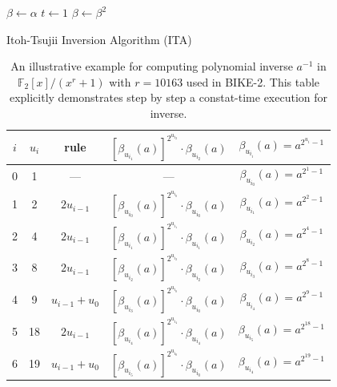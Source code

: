 \documentclass[preprint]{iacrtrans}
\begin{document}
\begin{algorithm}[!tb]
\DontPrintSemicolon %
$\beta \gets \alpha$ \;
$t \gets 1$ \;
 $\beta \gets \beta ^2$ \;
\Return {$\beta$}


\caption{Itoh-Tsujii Inversion Algorithm (ITA) \cite{hu2015fast}}
\label{algo:ITA}
\end{algorithm}

\begin{table}[!tb]\centering
\caption{An illustrative example for computing polynomial inverse $a^{-1}$ in $\mathbb{F}_2[x]/(x^r+1)$ with $r=10163$ used in BIKE-2. This table explicitly demonstrates step by step a constat-time execution for inverse.}\scriptsize
\label{table:ita_example}
\begin{tabular}{ccccc}
  \hline
  $i$ & $u_i$ & rule & $[\beta_{u_{i_1}}(a)]^{2^{u_{i_2}}}\cdot \beta_{u_{i_2}}(a)$ & $\beta_{u_{i_i}}(a)=a^{2^{u_i}-1}$\\
  \hline
  0   & 1       & --- & ---                                                         & $\beta_{u_{i_0}}(a)=a^{2^{1}-1}$\\
  1   & 2       & $2u_{i-1}$ &$[\beta_{u_{i_0}}(a)]^{2^{u_{i_0}}}\cdot \beta_{u_{i_0}}(a)$ & $\beta_{u_{i_1}}(a)=a^{2^{2}-1}$\\
  2   & 4       & $2u_{i-1}$ &$[\beta_{u_{i_1}}(a)]^{2^{u_{i_1}}}\cdot \beta_{u_{i_1}}(a)$ & $\beta_{u_{i_2}}(a)=a^{2^{4}-1}$\\
  3   & 8       & $2u_{i-1}$ &$[\beta_{u_{i_2}}(a)]^{2^{u_{i_2}}}\cdot \beta_{u_{i_2}}(a)$ & $\beta_{u_{i_3}}(a)=a^{2^{8}-1}$\\
  4   & 9  & $u_{i-1}+u_0$   &$[\beta_{u_{i_3}}(a)]^{2^{u_{i_0}}}\cdot \beta_{u_{i_0}}(a)$ & $\beta_{u_{i_4}}(a)=a^{2^{9}-1}$\\
  5   & 18       & $2u_{i-1}$ &$[\beta_{u_{i_4}}(a)]^{2^{u_{i_4}}}\cdot \beta_{u_{i_4}}(a)$ & $\beta_{u_{i_5}}(a)=a^{2^{18}-1}$\\
  6   & 19  & $u_{i-1}+u_0$   &$[\beta_{u_{i_5}}(a)]^{2^{u_{i_0}}}\cdot \beta_{u_{i_0}}(a)$ & $\beta_{u_{i_4}}(a)=a^{2^{19}-1}$\\

\end{tabular}
\end{table}
\end{document}
